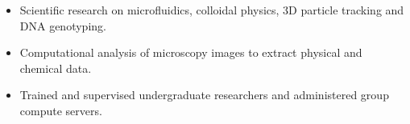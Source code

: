 \documentclass[11pt]{article}
\begin{document}
\begin{itemize}\setlength{\itemsep}{0cm}
  \setlength{\parskip}{0cm}

\item Scientific research on microfluidics, colloidal physics, 3D particle tracking and DNA genotyping.

\item Computational analysis of microscopy images to extract physical and chemical data.







\item Trained and supervised undergraduate researchers and administered group compute servers.







\end{itemize}
\end{document}
